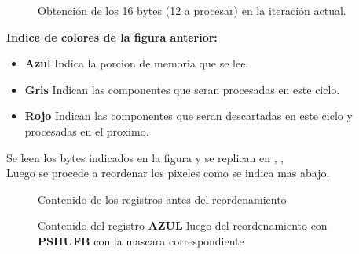 \begin{itemize}
\begin{figure}[!ht]
        \caption{Obtención de los 16 bytes (12 a procesar) en la iteración actual.}
        \label{pixeles}
      \end{figure}

      \textbf{Indice de colores de la figura anterior:}\\
      \begin{itemize}
        \item \textbf{Azul}
          Indica la porcion de memoria que se lee.\\
        \item \textbf{Gris}
          Indican las componentes que seran procesadas en este ciclo.\\
        \item \textbf{Rojo}
          Indican las componentes que seran descartadas en este ciclo y procesadas en el proximo.\\
      \end{itemize}

      Se leen los bytes indicados en la figura y se replican en , , \\

      Luego se procede a reordenar los pixeles como se indica mas abajo.\\

      \par      
      \bigskip
       \begin{figure}[!ht]
        \centering
        \caption{Contenido de los registros  antes del reordenamiento}
      \end{figure}

      \par      
      \bigskip
       \begin{figure}[!ht]
        \centering
        \caption{Contenido del registro \textbf{AZUL} luego del reordenamiento con \textbf{PSHUFB} con la mascara correspondiente}
      \end{figure}


\end{itemize}
